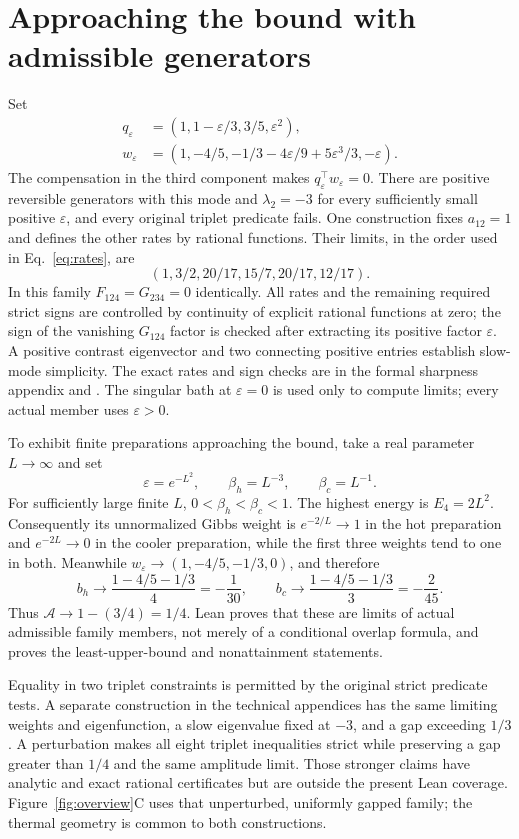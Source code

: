 \documentclass[11pt]{article}
\begin{document}
\section{Approaching the bound with admissible generators}\label{sec:sharpness}
Set
\begin{align}
 q_\varepsilon&=(1,1-\varepsilon/3,3/5,\varepsilon^2),\nonumber\\
 w_\varepsilon&=(1,-4/5,-1/3-4\varepsilon/9+5\varepsilon^3/3,-\varepsilon).
 \label{eq:sharpfamily}
\end{align}
The compensation in the third component makes $q_\varepsilon^\top
w_\varepsilon=0$. There are positive reversible generators with this
mode and $\lambda_2=-3$ for every sufficiently small positive
$\varepsilon$, and every original triplet predicate fails.
One construction fixes $a_{12}=1$ and defines the other rates by rational
functions. Their limits, in the order used in Eq.~\eqref{eq:rates}, are
\[
 (1,3/2,20/17,15/7,20/17,12/17).
\]
In this family $F_{124}=G_{234}=0$ identically. All rates and the
remaining required strict signs are controlled by continuity of explicit
rational functions at zero; the sign of the vanishing $G_{124}$ factor
is checked after extracting its positive factor $\varepsilon$.
A positive contrast eigenvector and two connecting positive entries
establish slow-mode simplicity. The exact rates and sign checks are in
the formal sharpness appendix and .
The singular bath at $\varepsilon=0$ is used only to compute limits;
every actual member uses $\varepsilon>0$.

To exhibit finite preparations approaching the bound, take a real
parameter $L\to\infty$ and set
\[
 \varepsilon=e^{-L^2},\qquad \beta_h=L^{-3},\qquad\beta_c=L^{-1}.
\]
For sufficiently large finite $L$, $0<\beta_h<\beta_c<1$.
The highest energy is $E_4=2L^2$. Consequently its unnormalized Gibbs
weight is $e^{-2/L}\to1$ in the hot preparation and
$e^{-2L}\to0$ in the cooler preparation, while the first three weights
tend to one in both. Meanwhile
$w_\varepsilon\to(1,-4/5,-1/3,0)$, and therefore
\[
 b_h\longrightarrow\frac{1-4/5-1/3}{4}=-\frac1{30},\qquad
 b_c\longrightarrow\frac{1-4/5-1/3}{3}=-\frac2{45}.
\]
Thus $\mathcal A\to1-(3/4)=1/4$. Lean proves that these are limits
of actual admissible family members, not merely of a conditional overlap
formula, and proves the least-upper-bound and nonattainment statements.

Equality in two triplet constraints is permitted by the original strict
predicate tests. A separate construction in the technical appendices
has the same limiting weights and eigenfunction, a slow eigenvalue fixed
at $-3$, and a gap exceeding $1/3$. A perturbation makes all eight
triplet inequalities strict while preserving a gap greater than $1/4$
and the same amplitude limit. Those stronger claims have analytic and
exact rational certificates but are outside the present Lean coverage.
Figure~\ref{fig:overview}C uses that unperturbed, uniformly gapped family;
the thermal geometry is common to both constructions.
\end{document}
